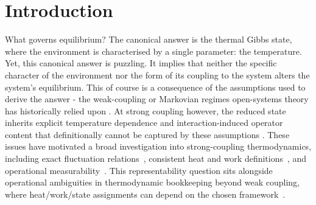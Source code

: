 \section{\label{sec:intro}Introduction}

What governs equilibrium? The canonical answer is the thermal Gibbs state, where the environment is characterised by a single parameter: the temperature. Yet, this canonical answer is puzzling. It implies that neither the specific character of the environment nor the form of its coupling to the system alters the system's equilibrium. This of course is a consequence of the assumptions used to derive the answer - the weak-coupling or Markovian regimes open-systems theory has historically relied upon \cite{breuerTheoryOpenQuantum2002}. At strong coupling however, the reduced state inherits explicit temperature dependence and interaction-induced operator content that definitionally cannot be captured by these assumptions \cite{hanggiFiniteQuantumDissipation2008,ingoldSpecificHeatAnomalies2009}. These issues have motivated a broad investigation into strong-coupling thermodynamics, including exact fluctuation relations~\cite{campisiFluctuationTheoremArbitrary2009,jarzynskiNonequilibriumWorkTheorem2004,gooldNonequilibriumThermodynamics2019}, consistent heat and work definitions~\cite{espositoNatureHeatStrongly2015,rivasStrongCouplingThermodynamics2020,lacerdaQuantumThermodynamicsFast2023}, and operational measurability~\cite{strasbergMeasurabilityNonequilibriumThermodynamics2020,millerEntropyProduction2017,binderOperationalThermodynamics2019}. This representability question sits alongside operational ambiguities in thermodynamic bookkeeping beyond weak coupling, where heat/work/state assignments can depend on the chosen framework~\cite{BinderVinjanampathyModiGoold2015}. 

